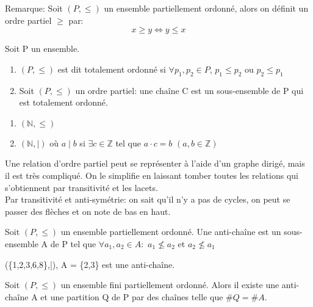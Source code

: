 Remarque: Soit $(P,\leq)$ un ensemble partiellement ordonné, alors on définit un ordre partiel $\geq$ par: $$x \geq y \Leftrightarrow y \leq x$$

\begin{defn}
Soit P un ensemble.
	\begin{enumerate}
		\item $(P,\leq)$ est dit totalement ordonné si $\forall p_{1},p_{2} \in P$, $p_{1} \leq p_{2}$ ou $p_{2} \leq p_{1}$
		\item Soit $(P,\leq)$ un ordre partiel: une chaîne C est un sous-ensemble de P qui est totalement ordonné.\\
	\end{enumerate}
\end{defn}

\begin{exmp}
	\begin{enumerate}
		\item $(\mathbb{N},\leq)$
		\item $(\mathbb{N},\mid)$ où $a \mid b$ si $\exists c \in \mathbb{Z}$ tel que $a \cdot c = b$ $(a,b \in \mathbb{Z})$\\
	\end{enumerate}
\end{exmp}


Une relation d'ordre partiel peut se représenter à l'aide d'un graphe dirigé, mais il est très compliqué. On le simplifie en laissant tomber toutes les relations qui s’obtiennent par transitivité et les lacets.\\

Par transitivité et anti-symétrie: on sait qu'il n'y a pas de cycles, on peut se passer des flèches et on note de bas en haut.\\



\begin{defn}
Soit $(P,\leq)$ un ensemble partiellement ordonné. Une anti-chaîne est un sous-ensemble A de P tel que $\forall a_{1},a_{2} \in A: $ $ a_{1} \nleqslant a_{2} $ et $ a_{2} \nleqslant a_{1} $
\end{defn}

\begin{exmp}
(\{1,2,3,6,8\},|), A = \{2,3\} est une anti-chaîne.
\end{exmp}

\begin{thrm}[Dilworth]
Soit $(P,\leq)$ un ensemble fini partiellement ordonné. Alors il existe une anti-chaîne A et une partition Q de P par des chaînes telle que $\#Q = \#A$.
\end{thrm}

